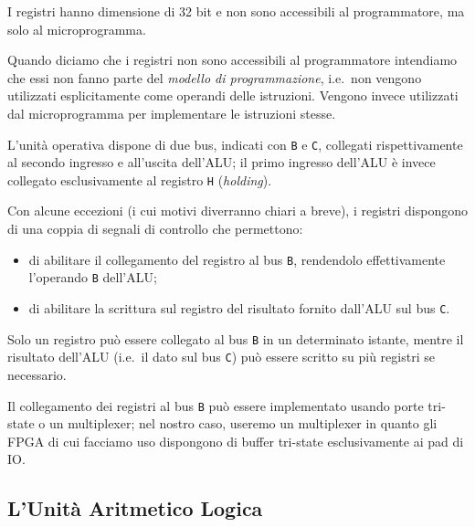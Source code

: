 \documentclass[a4paper,12pt]{scrreprt}
\begin{document}
I registri hanno dimensione di 32 bit e non sono accessibili al programmatore,
ma solo al microprogramma.

\begin{mynote}{}{}
  Quando diciamo che i registri non sono accessibili al programmatore intendiamo
  che essi non fanno parte del \textit{modello di programmazione}, i.e.~non
  vengono utilizzati esplicitamente come operandi delle istruzioni. Vengono
  invece utilizzati dal microprogramma per implementare le istruzioni stesse.
\end{mynote}

L'unità operativa dispone di due bus, indicati con \lstinline{B} e
\lstinline{C}, collegati rispettivamente al secondo ingresso e all'uscita
dell'ALU; il primo ingresso dell'ALU è invece collegato esclusivamente al
registro \lstinline{H} (\textit{holding}).

Con alcune eccezioni (i cui motivi diverranno chiari a breve), i registri
dispongono di una coppia di segnali di controllo che permettono:
\begin{itemize}
    \item di abilitare il collegamento del registro al bus \lstinline{B},
    rendendolo effettivamente l'operando \lstinline{B} dell'ALU;
    \item di abilitare la scrittura sul registro del risultato fornito dall'ALU
    sul bus \lstinline{C}.
\end{itemize}

Solo un registro può essere collegato al bus \lstinline{B} in un determinato
istante, mentre il risultato dell'ALU (i.e.~il dato sul bus \lstinline{C}) può
essere scritto su più registri se necessario.

\begin{mynote}{}{}
  Il collegamento dei registri al bus \lstinline{B} può essere implementato
  usando porte tri-state o un multiplexer; nel nostro caso, useremo un
  multiplexer in quanto gli FPGA di cui facciamo uso dispongono di buffer
  tri-state esclusivamente ai pad di IO.
\end{mynote}

\subsection{L'Unità Aritmetico Logica}
\end{document}
